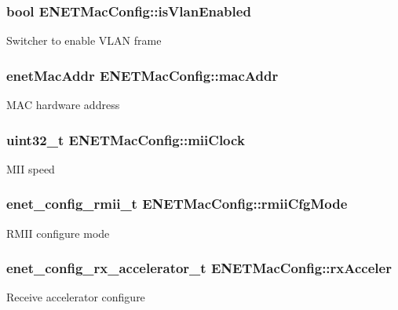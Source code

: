 \subsubsection[{\texorpdfstring{is\+Vlan\+Enabled}{isVlanEnabled}}]{\setlength{\rightskip}{0pt plus 5cm}bool E\+N\+E\+T\+Mac\+Config\+::is\+Vlan\+Enabled}\hypertarget{structENETMacConfig_a2162f6b3dabc2fd72e1789f9e5268d5a}{}\label{structENETMacConfig_a2162f6b3dabc2fd72e1789f9e5268d5a}
Switcher to enable V\+L\+AN frame 
\subsubsection[{\texorpdfstring{mac\+Addr}{macAddr}}]{\setlength{\rightskip}{0pt plus 5cm}enet\+Mac\+Addr E\+N\+E\+T\+Mac\+Config\+::mac\+Addr}\hypertarget{structENETMacConfig_a6aa1246b584e02fefc091b7b4066976e}{}\label{structENETMacConfig_a6aa1246b584e02fefc091b7b4066976e}
M\+AC hardware address 
\subsubsection[{\texorpdfstring{mii\+Clock}{miiClock}}]{\setlength{\rightskip}{0pt plus 5cm}uint32\+\_\+t E\+N\+E\+T\+Mac\+Config\+::mii\+Clock}\hypertarget{structENETMacConfig_a5f4e1022f95e0e358d01da53315198db}{}\label{structENETMacConfig_a5f4e1022f95e0e358d01da53315198db}
M\+II speed 
\subsubsection[{\texorpdfstring{rmii\+Cfg\+Mode}{rmiiCfgMode}}]{\setlength{\rightskip}{0pt plus 5cm}enet\+\_\+config\+\_\+rmii\+\_\+t E\+N\+E\+T\+Mac\+Config\+::rmii\+Cfg\+Mode}\hypertarget{structENETMacConfig_a74f82947427397ac885520f4a3078e7a}{}\label{structENETMacConfig_a74f82947427397ac885520f4a3078e7a}
R\+M\+II configure mode 
\subsubsection[{\texorpdfstring{rx\+Acceler}{rxAcceler}}]{\setlength{\rightskip}{0pt plus 5cm}enet\+\_\+config\+\_\+rx\+\_\+accelerator\+\_\+t E\+N\+E\+T\+Mac\+Config\+::rx\+Acceler}\hypertarget{structENETMacConfig_af29e92d609ebad99373f9408246dcfbf}{}\label{structENETMacConfig_af29e92d609ebad99373f9408246dcfbf}
Receive accelerator configure 
